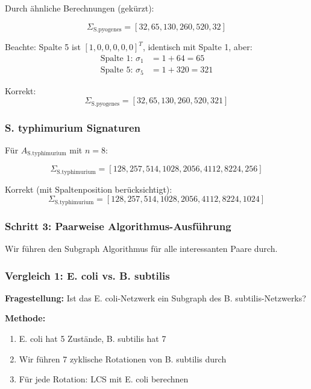\documentclass[a4paper,12pt]{article}
\theoremstyle{definition}
\begin{document}
Durch ähnliche Berechnungen (gekürzt):

\[
\boxed{\Sigma_{\text{S.pyogenes}} = [32, 65, 130, 260, 520, 32]}
\]

Beachte: Spalte 5 ist $[1, 0, 0, 0, 0, 0]^T$, identisch mit Spalte 1, aber:
\begin{align*}
\text{Spalte 1: } \sigma_1 &= 1 + 64 = 65 \\
\text{Spalte 5: } \sigma_5 &= 1 + 320 = 321
\end{align*}

Korrekt:
\[
\boxed{\Sigma_{\text{S.pyogenes}} = [32, 65, 130, 260, 520, 321]}
\]


\subsubsection*{S. typhimurium Signaturen}

Für $A_{\text{S.typhimurium}}$ mit $n = 8$:

\[
\boxed{\Sigma_{\text{S.typhimurium}} = [128, 257, 514, 1028, 2056, 4112, 8224, 256]}
\]

Korrekt (mit Spaltenposition berücksichtigt):
\[
\boxed{\Sigma_{\text{S.typhimurium}} = [128, 257, 514, 1028, 2056, 4112, 8224, 1024]}
\]

\subsubsection{Schritt 3: Paarweise Algorithmus-Ausführung}

Wir führen den Subgraph Algorithmus für alle interessanten Paare durch.

\subsubsection*{Vergleich 1: E. coli vs. B. subtilis}

\textbf{Fragestellung:} Ist das E. coli-Netzwerk ein Subgraph des B. subtilis-Netzwerks?

\textbf{Methode:} 
\begin{enumerate}
    \item E. coli hat 5 Zustände, B. subtilis hat 7
    \item Wir führen 7 zyklische Rotationen von B. subtilis durch
    \item Für jede Rotation: LCS mit E. coli berechnen
\end{enumerate}
\end{document}

